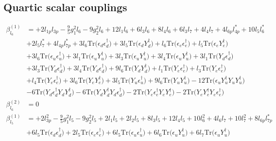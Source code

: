 \subsection{Quartic scalar couplings}
{\allowdisplaybreaks  \begin{align} 
\beta_{l_6}^{(1)} & =  
+2 l_{1p} l_{3p} -\frac{9}{5} g_{1}^{2} l_6 -9 g_{2}^{2} l_6 +12 l_1 l_6 +6 l_3 l_6 +8 l_4 l_6 +6 l_3 l_7 +4 l_4 l_7 +4 l_{6p} l_{4p}^* +10 l_5 l_6^* \nonumber \\ 
 &+2 l_5 l_7^* +4 l_{4p} l_{7p}^* +3 l_6 \mbox{Tr}\Big({\epsilon_d  \epsilon_{d}^{\dagger}}\Big) +3 l_5 \mbox{Tr}\Big({\epsilon_d  Y_{d}^{\dagger}}\Big) +l_6 \mbox{Tr}\Big({\epsilon_e  \epsilon_{e}^{\dagger}}\Big) +l_5 \mbox{Tr}\Big({\epsilon_e  Y_{e}^{\dagger}}\Big) \nonumber \\ 
 &+3 l_6 \mbox{Tr}\Big({\epsilon_u  \epsilon_{u}^{\dagger}}\Big) +3 l_1 \mbox{Tr}\Big({\epsilon_u  Y_{u}^{\dagger}}\Big) +3 l_3 \mbox{Tr}\Big({\epsilon_u  Y_{u}^{\dagger}}\Big) +3 l_4 \mbox{Tr}\Big({\epsilon_u  Y_{u}^{\dagger}}\Big) +3 l_1 \mbox{Tr}\Big({Y_d  \epsilon_{d}^{\dagger}}\Big) \nonumber \\ 
 &+3 l_3 \mbox{Tr}\Big({Y_d  \epsilon_{d}^{\dagger}}\Big) +3 l_4 \mbox{Tr}\Big({Y_d  \epsilon_{d}^{\dagger}}\Big) +9 l_6 \mbox{Tr}\Big({Y_d  Y_{d}^{\dagger}}\Big) +l_1 \mbox{Tr}\Big({Y_e  \epsilon_{e}^{\dagger}}\Big) +l_3 \mbox{Tr}\Big({Y_e  \epsilon_{e}^{\dagger}}\Big) \nonumber \\ 
 &+l_4 \mbox{Tr}\Big({Y_e  \epsilon_{e}^{\dagger}}\Big) +3 l_6 \mbox{Tr}\Big({Y_e  Y_{e}^{\dagger}}\Big) +3 l_5 \mbox{Tr}\Big({Y_u  \epsilon_{u}^{\dagger}}\Big) +9 l_6 \mbox{Tr}\Big({Y_u  Y_{u}^{\dagger}}\Big) -12 \mbox{Tr}\Big({\epsilon_u  Y_{u}^{\dagger}  Y_u  Y_{u}^{\dagger}}\Big) \nonumber \\ 
 &-6 \mbox{Tr}\Big({Y_d  \epsilon_{d}^{\dagger}  Y_d  Y_{d}^{\dagger}}\Big) -6 \mbox{Tr}\Big({Y_d  Y_{d}^{\dagger}  Y_d  \epsilon_{d}^{\dagger}}\Big) -2 \mbox{Tr}\Big({Y_e  \epsilon_{e}^{\dagger}  Y_e  Y_{e}^{\dagger}}\Big) -2 \mbox{Tr}\Big({Y_e  Y_{e}^{\dagger}  Y_e  \epsilon_{e}^{\dagger}}\Big) \\ 
\beta_{l_6}^{(2)} & =  
0\\ 
\beta_{l_5}^{(1)} & =  
+2 l_{3p}^{2} -\frac{9}{5} g_{1}^{2} l_5 -9 g_{2}^{2} l_5 +2 l_1 l_5 +2 l_2 l_5 +8 l_3 l_5 +12 l_4 l_5 +10 l_{6}^{2} +4 l_6 l_7 +10 l_{7}^{2} +8 l_{6p} l_{7p}^* \nonumber \\ 
 &+6 l_5 \mbox{Tr}\Big({\epsilon_d  \epsilon_{d}^{\dagger}}\Big) +2 l_5 \mbox{Tr}\Big({\epsilon_e  \epsilon_{e}^{\dagger}}\Big) +6 l_5 \mbox{Tr}\Big({\epsilon_u  \epsilon_{u}^{\dagger}}\Big) +6 l_6 \mbox{Tr}\Big({\epsilon_u  Y_{u}^{\dagger}}\Big) +6 l_7 \mbox{Tr}\Big({\epsilon_u  Y_{u}^{\dagger}}\Big) \nonumber \\ 

\end{align}}
